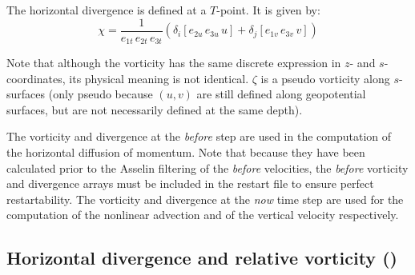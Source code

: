 The horizontal divergence is defined at a $T$-point. It is given by:
\begin{equation} \label{Eq_divcur_div}
\chi =\frac{1}{e_{1t}\,e_{2t}\,e_{3t} }
		\left( {\delta _i \left[ {e_{2u}\,e_{3u}\,u} \right]
		       +\delta _j \left[ {e_{1v}\,e_{3v}\,v} \right]} \right)
\end{equation} 

Note that although the vorticity has the same discrete expression in $z$- 
and $s$-coordinates, its physical meaning is not identical. $\zeta$ is a pseudo 
vorticity along $s$-surfaces (only pseudo because $(u,v)$ are still defined along 
geopotential surfaces, but are not necessarily defined at the same depth).

The vorticity and divergence at the \textit{before} step are used in the computation 
of the horizontal diffusion of momentum. Note that because they have been 
calculated prior to the Asselin filtering of the \textit{before} velocities, the 
\textit{before} vorticity and divergence arrays must be included in the restart file 
to ensure perfect restartability. The vorticity and divergence at the \textit{now} 
time step are used for the computation of the nonlinear advection and of the 
vertical velocity respectively. 

\subsection   [Sea surface height evolution and vertical velocity (\textit{sshwzv})]
			{Horizontal divergence and relative vorticity ()}
\label{DYN_sshwzv}

